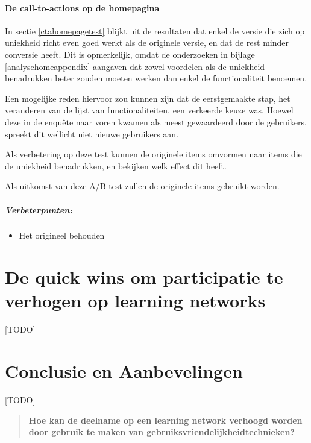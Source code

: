\documentclass[a4paper, 10pt, pdftex]{report}
\begin{document}
     \subsubsection{De call-to-actions op de homepagina}
      \label{wak:ctahome}
      In sectie \ref{ctahomepagetest} blijkt uit de resultaten dat enkel de versie die zich op uniekheid richt even goed werkt als de originele versie, en dat de rest minder conversie heeft. Dit is opmerkelijk, omdat de onderzoeken in bijlage \ref{analysehomeappendix} aangaven dat zowel voordelen als de uniekheid benadrukken beter zouden moeten werken dan enkel de functionaliteit benoemen.

      Een mogelijke reden hiervoor zou kunnen zijn dat de eerstgemaakte stap, het veranderen van de lijst van functionaliteiten, een verkeerde keuze was. Hoewel deze in de enqu\^ete naar voren kwamen als meest gewaardeerd door de gebruikers, spreekt dit wellicht niet nieuwe gebruikers aan.

      Als verbetering op deze test kunnen de originele items omvormen naar items die de uniekheid benadrukken, en bekijken welk effect dit heeft.

      Als uitkomst van deze A/B test zullen de originele items gebruikt worden.

    \paragraph{\textbf{Verbeterpunten:}}
      \begin{itemize}
        \item Het origineel behouden
      \end{itemize}

  \newpage
  \chapter{De quick wins om participatie te verhogen op learning networks}
[TODO]

  \newpage
  \chapter*{Conclusie en Aanbevelingen}
[TODO]
    \begin{quotation}
     \textbf{Hoe kan de deelname op een learning network verhoogd worden door gebruik te maken van gebruiksvriendelijkheidtechnieken?}
    \end{quotation}
    
\end{document}
